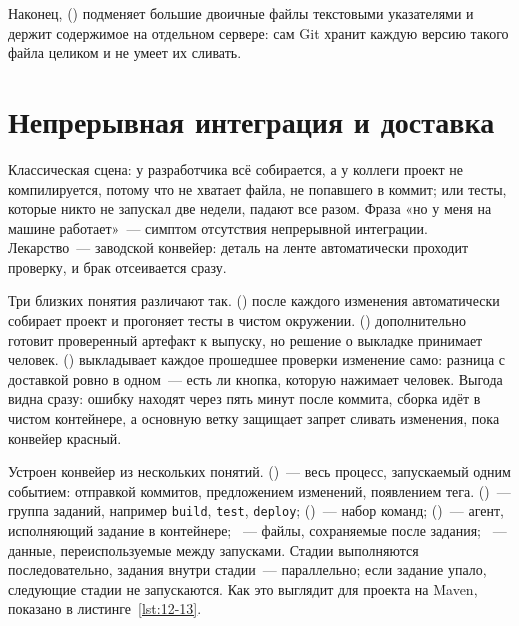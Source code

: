Наконец,  () подменяет большие двоичные файлы текстовыми указателями и держит содержимое на отдельном сервере: сам Git хранит каждую версию такого файла целиком и не умеет их сливать.

\section{Непрерывная интеграция и доставка}

Классическая сцена: у разработчика всё собирается, а у коллеги проект не компилируется, потому что не хватает файла, не попавшего в коммит; или тесты, которые никто не запускал две недели, падают все разом. Фраза «но у меня на машине работает»~--- симптом отсутствия непрерывной интеграции. Лекарство~--- заводской конвейер: деталь на ленте автоматически проходит проверку, и брак отсеивается сразу.

Три близких понятия различают так.  () после каждого изменения автоматически собирает проект и прогоняет тесты в чистом окружении.  () дополнительно готовит проверенный артефакт к выпуску, но решение о выкладке принимает человек.  () выкладывает каждое прошедшее проверки изменение само: разница с доставкой ровно в одном~--- есть ли кнопка, которую нажимает человек. Выгода видна сразу: ошибку находят через пять минут после коммита, сборка идёт в чистом контейнере, а основную ветку защищает запрет сливать изменения, пока конвейер красный.

Устроен конвейер из нескольких понятий.  ()~--- весь процесс, запускаемый одним событием: отправкой коммитов, предложением изменений, появлением тега.  ()~--- группа заданий, например \texttt{build}, \texttt{test}, \texttt{deploy};  ()~--- набор команд;  ()~--- агент, исполняющий задание в контейнере; ~--- файлы, сохраняемые после задания; ~--- данные, переиспользуемые между запусками. Стадии выполняются последовательно, задания внутри стадии~--- параллельно; если задание упало, следующие стадии не запускаются. Как это выглядит для проекта на Maven, показано в листинге~\ref{lst:12-13}.

